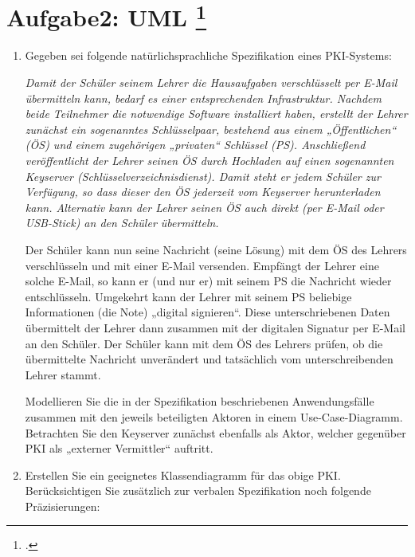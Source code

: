 \documentclass{lehramt-informatik-aufgabe}
\begin{document}
\section{Aufgabe2: UML
\footcite{examen:66116:2016:09}}

\begin{enumerate}


\item Gegeben sei folgende natürlichsprachliche Spezifikation eines
PKI-Systems:

{
\itshape
Damit der Schüler seinem Lehrer die Hausaufgaben verschlüsselt per
E-Mail übermitteln kann, bedarf es einer entsprechenden Infrastruktur.
Nachdem beide Teilnehmer die notwendige Software installiert haben,
erstellt der Lehrer zunächst ein sogenanntes Schlüsselpaar, bestehend
aus einem „Öffentlichen“ (ÖS) und einem zugehörigen „privaten“ Schlüssel
(PS). Anschließend veröffentlicht der Lehrer seinen ÖS durch Hochladen
auf einen sogenannten Keyserver (Schlüsselverzeichnisdienst). Damit
steht er jedem Schüler zur Verfügung, so dass dieser den ÖS jederzeit
vom Keyserver herunterladen kann. Alternativ kann der Lehrer seinen ÖS
auch direkt (\zB per E-Mail oder USB-Stick) an den Schüler
übermitteln.

Der Schüler kann nun seine Nachricht (\zB seine Lösung) mit dem ÖS
des Lehrers verschlüsseln und mit einer E-Mail versenden. Empfängt der
Lehrer eine solche E-Mail, so kann er (und nur er) mit seinem PS die
Nachricht wieder entschlüsseln. Umgekehrt kann der Lehrer mit seinem PS
beliebige Informationen (\zB die Note) „digital signieren“. Diese
unterschriebenen Daten übermittelt der Lehrer dann zusammen mit der
digitalen Signatur per E-Mail an den Schüler. Der Schüler kann mit dem
ÖS des Lehrers prüfen, ob die übermittelte Nachricht unverändert und
tatsächlich vom unterschreibenden Lehrer stammt.}

Modellieren Sie die in der Spezifikation beschriebenen Anwendungsfälle
zusammen mit den jeweils beteiligten Aktoren in einem Use-Case-Dia\-gramm.
Betrachten Sie den Keyserver zunächst ebenfalls als Aktor, welcher
gegenüber PKI als „externer Vermittler“ auftritt.


\item Erstellen Sie ein geeignetes Klassendiagramm für das obige PKI.
Berücksichtigen Sie zusätzlich zur verbalen Spezifikation noch folgende
Präzisierungen:


\end{enumerate}
\end{document}
